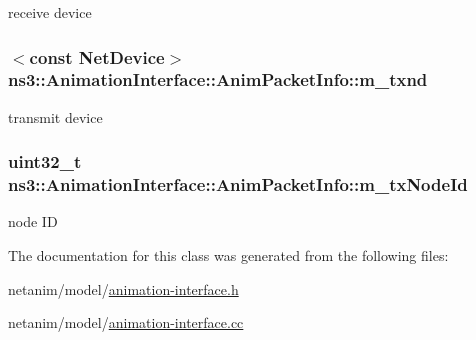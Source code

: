 receive device 

\subsubsection[{\texorpdfstring{m\+\_\+txnd}{m_txnd}}]{$<$const {\bf Net\+Device}$>$ ns3\+::\+Animation\+Interface\+::\+Anim\+Packet\+Info\+::m\+\_\+txnd}\hypertarget{classns3_1_1AnimationInterface_1_1AnimPacketInfo_a8076863a20bce78ea2085a3196d3de0d}{}\label{classns3_1_1AnimationInterface_1_1AnimPacketInfo_a8076863a20bce78ea2085a3196d3de0d}


transmit device 

\subsubsection[{\texorpdfstring{m\+\_\+tx\+Node\+Id}{m_txNodeId}}]{\setlength{\rightskip}{0pt plus 5cm}uint32\+\_\+t ns3\+::\+Animation\+Interface\+::\+Anim\+Packet\+Info\+::m\+\_\+tx\+Node\+Id}\hypertarget{classns3_1_1AnimationInterface_1_1AnimPacketInfo_aebde6b88dae741a09abe17cd26174fea}{}\label{classns3_1_1AnimationInterface_1_1AnimPacketInfo_aebde6b88dae741a09abe17cd26174fea}


node ID 



The documentation for this class was generated from the following files\+:\begin{DoxyCompactItemize}
\item 
netanim/model/\hyperlink{animation-interface_8h}{animation-\/interface.\+h}\item 
netanim/model/\hyperlink{animation-interface_8cc}{animation-\/interface.\+cc}\end{DoxyCompactItemize}
